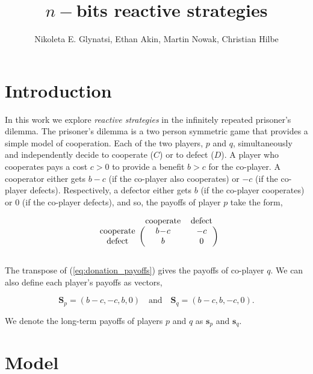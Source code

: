 \documentclass{article}
\title{$n-$bits reactive strategies}
\author{Nikoleta E. Glynatsi, Ethan Akin, Martin Nowak, Christian Hilbe}
\date{}
\theoremstyle{definition}
\begin{document}
\maketitle


\section{Introduction}

In this work we explore \textit{reactive strategies} in the infinitely repeated
prisoner's dilemma. The prisoner's dilemma is a two person symmetric game that
provides a simple model of cooperation. Each of the two players, \(p\) and
\(q\), simultaneously and independently decide to cooperate (\(C\)) or to defect
(\(D\)). A player who cooperates pays a cost \(c > 0\) to provide a benefit \(b
> c\) for the co-player. A cooperator either gets \(b\!-\!c\) (if the co-player
also cooperates) or \(-c\) (if the co-player defects). Respectively, a defector
either gets \(b\) (if the co-player cooperates) or 0 (if the co-player defects),
and so, the payoffs of player \(p\) take the form,

\begin{equation}\label{eq:donation_payoffs}
  \begin{blockarray}{ccc}
      & \text{cooperate} & \text{defect} \\
      \begin{block}{c(cc)}
          \text{cooperate} & b\!-\!c & -c \\
          \text{defect} & b & 0 \\
      \end{block}
  \end{blockarray}
\end{equation}

The transpose of (\ref{eq:donation_payoffs}) gives the payoffs of co-player
\(q\). We can also define each player's payoffs as vectors,

\begin{equation}\label{eq:vector_payoffs}
  \mathbf{S}_{p} = (b\!-\!c, -c, b, 0) \quad \textrm{and} \quad  \mathbf{S}_{q} = (b\!-\!c, b, -c, 0).
\end{equation}

We denote the long-term payoffs of players \(p\) and \(q\) as \(\mathbf{s}_{p}\)
and \(\mathbf{s}_{q}\).

\section{Model}
\end{document}

